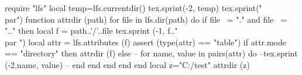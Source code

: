 \documentclass{tufte-book}
\begin{document}
\begin{luacode}
  require "lfs"
  local temp=lfs.currentdir()
  tex.sprint(-2, temp)
  tex.sprint("\\par")
  function attrdir (path)
    for file in lfs.dir(path) do
        if file ~= "." and file ~= ".." then
            local f = path..'/'..file
            tex.sprint (-1, f.."\\par     ")
            local attr = lfs.attributes (f)
            assert (type(attr) == "table")
            if attr.mode == "directory" then
                attrdir (f)
            else
               -- for name, value in pairs(attr) do
                    --tex.sprint (-2,name, value)
                -- end
            end
        end
    end
  end
  local z="C:/test"
  attrdir (z)
\end{luacode}
\end{document}
